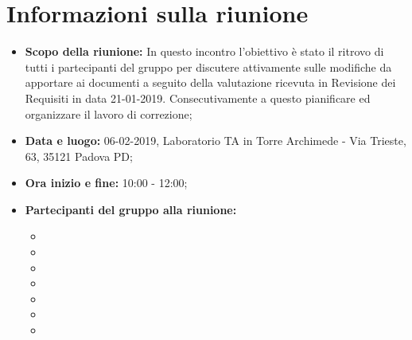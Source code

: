 \clearpage
\section{Informazioni sulla riunione}
\begin{itemize}
	\item \textbf {Scopo della riunione:} In questo incontro l'obiettivo è stato il ritrovo di tutti i partecipanti del gruppo per discutere attivamente sulle modifiche da apportare ai documenti a seguito della valutazione ricevuta in Revisione dei Requisiti in data 21-01-2019. Consecutivamente a questo pianificare ed organizzare il lavoro di correzione;
	\item \textbf {Data e luogo:} 06-02-2019, Laboratorio TA in Torre Archimede - Via Trieste, 63, 35121 Padova PD;
	\item \textbf {Ora inizio e fine:} 10:00 - 12:00;
	\item \textbf {Partecipanti del gruppo alla riunione:} 
		 \begin{itemize}
			\item \sonia
			\item \luca
			\item \matteo
			\item \pardeep
			\item \alberto
			\item \alessandro
			\item \andrea
		\end{itemize}
\end{itemize}